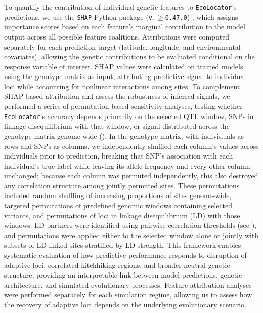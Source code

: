 \documentclass[]{article}
\newcommand{\ecolocator}{\texttt{EcoLocator}\xspace}
\begin{document}
To quantify the contribution of individual genetic features
to \ecolocator's predictions, we use the \texttt{SHAP} Python
package (\texttt{v.$\geq$0.47.0}) \citep{lundberg_shap_2017},
which assigns importance scores
based on each feature's marginal contribution to the model output
across all possible feature coalitions.
Attributions were computed separately for each prediction target
(latitude, longitude, and environmental covariates),
allowing the genetic contributions to be evaluated
conditional on the response variable of interest.
SHAP values were calculated on trained models
using the genotype matrix as input,
attributing predictive signal to individual loci
while accounting for nonlinear interactions among sites.
To complement SHAP-based attribution
and assess the robustness of inferred signals,
we performed a series of permutation-based sensitivity analyses,
testing whether \ecolocator's accuracy depends primarily on the selected QTL window, 
SNPs in linkage disequilibrium with that window, 
or signal distributed across the genotype matrix genome-wide 
().
In the genotype matrix,
with individuals as rows and SNPs as columns,
we independently shuffled each column's values across individuals prior to prediction,
breaking that SNP's association with each individual's true label
while leaving its allele frequency and every other column unchanged;
because each column was permuted independently, this also destroyed any 
correlation structure among jointly permuted sites.
These permutations included random shuffling
of increasing proportions of sites genome-wide,
targeted permutations of predefined genomic windows
containing selected variants,
and permutations of loci in linkage disequilibrium (LD)
with those windows.
LD partners were identified using pairwise correlation thresholds
(see ),
and permutations were applied either to the selected window alone
or jointly with subsets of LD-linked sites
stratified by LD strength.
This framework enables systematic evaluation
of how predictive performance responds to disruption
of adaptive loci, correlated hitchhiking regions,
and broader neutral genetic structure,
providing an interpretable link between model predictions,
genetic architecture, and simulated evolutionary processes.
Feature attribution analyses were performed separately
for each simulation regime,
allowing us to assess how the recovery of adaptive loci
depends on the underlying evolutionary scenario.
\end{document}
